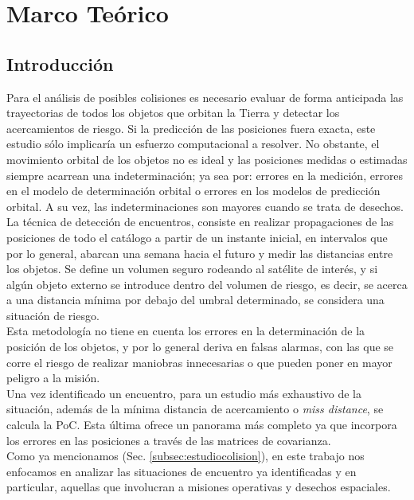 \chapter{Marco Teórico}
\label{chap:marcoteorico}

\section{Introducci\'on}

Para el an\'alisis de posibles colisiones es necesario evaluar de forma anticipada las trayectorias de todos los objetos que orbitan la Tierra y detectar los acercamientos de riesgo. Si la predicci\'on de las posiciones fuera exacta, este estudio s\'olo implicar\'ia un esfuerzo computacional a resolver. No obstante, el movimiento orbital de los objetos no es ideal y las posiciones medidas o estimadas siempre acarrean una indeterminaci\'on; ya sea por: errores en la medici\'on, errores en el modelo de determinaci\'on orbital o errores en los modelos de predicci\'on orbital. A su vez, las indeterminaciones son mayores cuando se trata de desechos.\\

La t\'ecnica de detecci\'on de encuentros, consiste en realizar propagaciones de las posiciones de todo el cat\'alogo a partir de un instante inicial, en intervalos que por lo general, abarcan una semana hacia el futuro y medir las distancias entre los objetos. Se define un volumen seguro rodeando al sat\'elite de inter\'es, y si alg\'un objeto externo se introduce dentro del volumen de riesgo, es decir, se acerca a una distancia m\'inima por debajo del umbral determinado, se considera una situaci\'on de riesgo.\\ 
Esta metodolog\'ia no tiene en cuenta los errores en la determinaci\'on de la posici\'on de los objetos, y por lo general deriva en falsas alarmas, con las que se corre el riesgo de realizar maniobras innecesarias o que pueden poner en mayor peligro a la misi\'on.\\
Una vez identificado un encuentro, para un estudio m\'as exhaustivo de la situaci\'on, adem\'as de la m\'inima distancia de acercamiento o {\it{miss distance}}, se calcula la PoC.  Esta \'ultima ofrece un panorama m\'as completo ya que incorpora los errores en las posiciones a trav\'es de las matrices de covarianza.\\

Como ya mencionamos (Sec. \ref{subsec:estudiocolision}), en este trabajo nos enfocamos en analizar las situaciones de encuentro ya identificadas y en particular, aquellas que involucran a misiones operativas y desechos espaciales.\\

